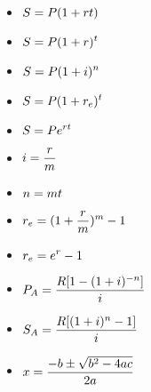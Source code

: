 \documentclass[12pt,legalpaper]{exam}
\begin{document}
\begin{itemize}
\item $\displaystyle{S = P(1 + rt)}$
\item $\displaystyle{S = P(1 + r)^t}$
\item $\displaystyle{S = P(1 + i)^n}$
\item $\displaystyle{S = P(1 + r_{e})^{t}}$
\item $\displaystyle{S = Pe^{rt}}$
\item $\displaystyle{i = \frac{r}{m}}$
\item $\displaystyle{n = mt}$
\item $\displaystyle{r_{e} = (1 + \frac{r}{m})^{m} - 1}$
\item $\displaystyle{r_{e} = e^{r} - 1}$
\item $\displaystyle{P_{A} = \frac{R[1 - (1 + i)^{-n}]}{i}}$
\item $\displaystyle{S_{A} = \frac{R[(1 + i)^{n} - 1]}{i}}$
\item $\displaystyle{x = \frac{-b \pm \sqrt{b^2 - 4ac}}{2a}}$ 
\end{itemize}
\end{document}
